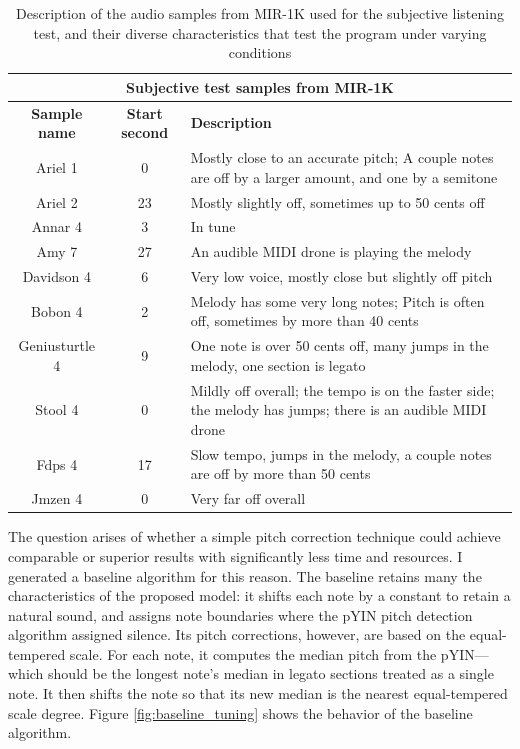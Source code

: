 \begin{table}
\centering
\begin{tabularx}{\columnwidth}{ |c|c|X| } 
\hline
\multicolumn{3}{|c|}{\textbf{Subjective test samples from MIR-1K}}\\
\hline\hline
\textbf{Sample name} & \textbf{Start second} & \textbf{Description} \\
\hline\hline
Ariel 1 & 0 & Mostly close to an accurate pitch; A couple notes are off by a larger amount, and one by a semitone \\
\hline
Ariel 2 & 23 & Mostly slightly off, sometimes up to 50 cents off\\ 
\hline
Annar 4 & 3 & In tune\\ 
\hline
Amy 7 & 27 & An audible MIDI drone is playing the melody\\
\hline
Davidson 4 & 6 & Very low voice, mostly close but slightly off pitch \\ 
\hline
Bobon 4 & 2 & Melody has some very long notes; Pitch is often off, sometimes by more than 40 cents\\ 
\hline
Geniusturtle 4 & 9 & One note is over 50 cents off, many jumps in the melody, one section is legato\\ 
\hline
Stool 4 & 0 & Mildly off overall; the tempo is on the faster side; the melody has jumps; there is an audible MIDI drone\\ 
\hline
Fdps 4 & 17 & Slow tempo, jumps in the melody, a couple notes are off by more than 50 cents\\ 
\hline
Jmzen 4 & 0 & Very far off overall\\ 
\hline
\end{tabularx}
\label{table:audio-samples}
\caption{Description of the audio samples from MIR-1K used for the subjective listening test, and their diverse characteristics that test the program under varying conditions}
\end{table}

The question arises of whether a simple pitch correction technique could achieve comparable or superior results with significantly less time and resources. I generated a baseline algorithm for this reason. The baseline retains many the characteristics of the proposed model: it shifts each note by a constant to retain a natural sound, and assigns note boundaries where the pYIN pitch detection algorithm assigned silence. Its pitch corrections, however, are based on the equal-tempered scale. For each note, it computes the median pitch from the pYIN---which should be the longest note's median in legato sections treated as a single note. It then shifts the note so that its new median is the nearest equal-tempered scale degree. Figure \ref{fig:baseline_tuning} shows the behavior of the baseline algorithm.

